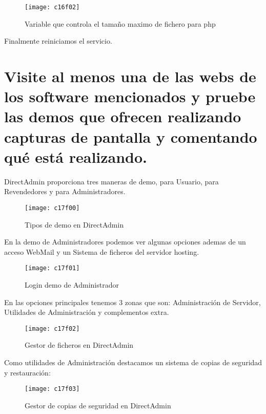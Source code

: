 \begin{figure}[H]
	\centering
	\texttt{[image: c16f02]}
	\caption{Variable que controla el tamaño maximo de fichero para php}
	\label{fig:c16f02}
\end{figure}

Finalmente reiniciamos el servicio.\\
\clearpage
\section{Visite al menos una de las webs de los software mencionados y pruebe las demos que ofrecen realizando capturas de pantalla y comentando qué está realizando.}


DirectAdmin proporciona tres maneras de demo, para Usuario, para Revendedores y para Administradores. \\
\begin{figure}[H]
	\centering
	\texttt{[image: c17f00]}
	\caption{Tipos de demo en DirectAdmin}
	\label{fig:c17f00}
\end{figure}
\clearpage
En la demo de Administradores podemos ver algunas opciones ademas de un acceso WebMail y un Sistema de ficheros del servidor hosting. \\
\begin{figure}[H]
	\centering
	\texttt{[image: c17f01]}
	\caption{Login demo de Administrador}
	\label{fig:c17f01}
\end{figure}

En las opciones principales tenemos 3 zonas que son: Administración de Servidor, Utilidades de Administración  y complementos extra.
\begin{figure}[H]
	\centering
	\texttt{[image: c17f02]}
	\caption{Gestor de ficheros en DirectAdmin}
	\label{fig:c17f02}
\end{figure}

Como utilidades de Administración destacamos un sistema de copias de seguridad y restauración:\\
\begin{figure}[H]
	\centering
	\texttt{[image: c17f03]}
	\caption{Gestor de copias de seguridad en DirectAdmin}
	\label{fig:c17f03}
\end{figure}


